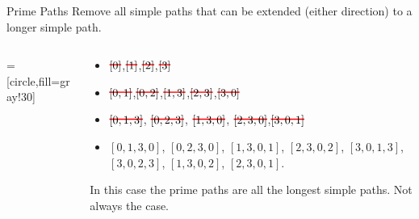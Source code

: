 \documentclass[handout]{beamer}
\newcommand\hcancel[2][red]{\setbox0=\hbox{$#2$}%
\rlap{\raisebox{.45\ht0}{\textcolor{#1}{\rule{\wd0}{1pt}}}}#2}
\begin{document}
\begin{frame}{Prime Paths}
  Remove all simple paths that can be extended (either direction) to a
  longer simple path.
\begin{columns}
\begin{column}{0.3\textwidth}    
 =[circle,fill=gray!30]
\end{column}
\begin{column}{0.6\textwidth}
  \begin{itemize}
  \item $\hcancel{[0]}$,$\hcancel{[1]}$,$\hcancel{[2]}$,$\hcancel{[3]}$
  \item $\hcancel{[0,1]}$,$\hcancel{[0,2]}$,$\hcancel{[1,3]}$,$\hcancel{[2,3]}$,$\hcancel{[3,0]}$
  \item $\hcancel{[ 0,1,3]}$, $\hcancel{[0,2,3]}$, $\hcancel{[1,3,0]}$, $\hcancel{[2,3,0]}$,$\hcancel{[3,0,1]}$
  \item $[ 0, 1, 3, 0 ]$, $[ 0, 2, 3, 0]$, $[ 1, 3, 0, 1 ]$,
$[ 2, 3, 0, 2 ]$, $[ 3, 0, 1, 3 ]$, $[ 3, 0, 2, 3 ]$, $[ 1, 3, 0, 2 ]$,
$[ 2, 3, 0, 1 ]$.
  \end{itemize}
In this case the prime paths are all the longest simple paths. Not
always the case. 
\end{column}
\end{columns}
  
\end{frame}
\end{document}

